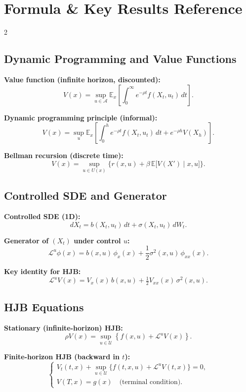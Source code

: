 \documentclass[12pt]{article}
\begin{document}
\section{Formula \& Key Results Reference}
\begin{multicols}{2}

\subsection*{Dynamic Programming and Value Functions}

\noindent\textbf{Value function (infinite horizon, discounted):}
\[
V(x) = \sup_{u\in\mathcal{A}}
\mathbb{E}_x\!\left[\int_0^\infty e^{-\rho t} f(X_t,u_t)\,dt\right].
\]

\noindent\textbf{Dynamic programming principle (informal):}
\[
V(x) = \sup_{u}
\mathbb{E}_x\!\left[
  \int_0^h e^{-\rho t} f(X_t,u_t)\,dt
  + e^{-\rho h} V(X_h)
\right]\!.
\]

\noindent\textbf{Bellman recursion (discrete time):}
\[
V(x) = \sup_{u\in U(x)} \Big\{
  r(x,u) + \beta\,\mathbb{E}\big[V(X' ) \mid x,u\big]
\Big\}.
\]

\subsection*{Controlled SDE and Generator}

\noindent\textbf{Controlled SDE (1D):}
\[
dX_t = b(X_t,u_t)\,dt + \sigma(X_t,u_t)\,dW_t.
\]

\noindent\textbf{Generator of $(X_t)$ under control $u$:}
\[
\mathcal{L}^u \phi(x)
= b(x,u)\,\phi_x(x)
+ \frac12 \sigma^2(x,u)\,\phi_{xx}(x).
\]

\noindent\textbf{Key identity for HJB:}
\[
\mathcal{L}^u V(x)
= V_x(x)\,b(x,u)
+ \tfrac12 V_{xx}(x)\,\sigma^2(x,u).
\]

\subsection*{HJB Equations}

\noindent\textbf{Stationary (infinite-horizon) HJB:}
\[
\rho V(x) =
\sup_{u\in\mathcal{U}}
\left\{
  f(x,u) + \mathcal{L}^u V(x)
\right\}.
\]

\noindent\textbf{Finite-horizon HJB (backward in $t$):}
\[
\begin{cases}
V_t(t,x)
+ \displaystyle \sup_{u\in\mathcal{U}}
\bigl\{
  f(t,x,u) + \mathcal{L}^u V(t,x)
\bigr\}
= 0,\\[0.4em]
V(T,x) = g(x) \quad \text{(terminal condition)}.
\end{cases}
\]


\end{multicols}
\end{document}
